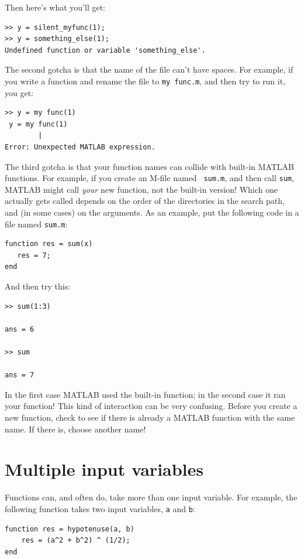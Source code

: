 \documentclass[
]{book}
\begin{document}
Then here's what you'll get:

\begin{verbatim}
>> y = silent_myfunc(1);
>> y = something_else(1);
Undefined function or variable 'something_else'.
\end{verbatim}

The second gotcha is that the name of the file can't have spaces.
For example, if you write a function and rename the file to {\tt my func.m},
and then
try to run it, you get:

\begin{verbatim}
>> y = my func(1)
 y = my func(1)
        |
Error: Unexpected MATLAB expression.
\end{verbatim}

The third gotcha is that your function names can collide with built-in
MATLAB functions.  For example, if you create an M-file named {\tt
sum.m}, and then call {\tt sum}, MATLAB might call {\em your} new
function, not the built-in version!  Which one actually gets called
depends on the order of the directories in the search path, and
(in some cases) on the arguments.  As an example, put the following
code in a file named {\tt sum.m}:

\begin{verbatim}
function res = sum(x)
   res = 7;
end
\end{verbatim}

And then try this:

\begin{verbatim}
>> sum(1:3)

ans = 6

>> sum

ans = 7
\end{verbatim}

In the first case MATLAB used the built-in function; in the second
case it ran your function!  This kind of interaction can be very
confusing.  Before you create a new function, check to see if there is
already a MATLAB function with the same name.  If there is, choose
another name!


\section{Multiple input variables}
\label{sect:hypotenuse}

Functions can, and often do, take more than one input variable.
For example, the following function takes two input variables,
{\tt a} and {\tt b}:

\begin{verbatim}
function res = hypotenuse(a, b)
    res = (a^2 + b^2) ^ (1/2);
end
\end{verbatim}
\end{document}
